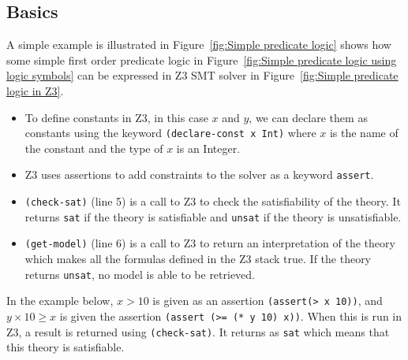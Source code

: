 \documentclass[a4paper]{report}
\begin{document}
\subsection{Basics}
A simple example is illustrated in Figure~\ref{fig:Simple predicate logic} shows how some simple first order predicate logic in Figure~\ref{fig:Simple predicate logic using logic symbols} can be expressed in Z3 SMT solver in  Figure~\ref{fig:Simple predicate logic in Z3}.
\begin{itemize}
\item To define constants in Z3, in this case $x$ and $y$, we can declare them as constants using the keyword \texttt{(declare-const x Int)} where $x$ is the name of the constant and the type of $x$ is an Integer.
\item Z3 uses assertions to add constraints to the solver as a keyword \texttt{assert}. 
\item \texttt{(check-sat)} (line 5) is a call to Z3 to check the satisfiability of the theory. It returns \texttt{sat} if the theory is satisfiable and \texttt{unsat} if the theory is unsatisfiable.
\item \texttt{(get-model)} (line 6) is a call to Z3 to return an interpretation of the theory which makes all the formulas defined in the Z3 stack true. If the theory returns \texttt{unsat}, no model is able to be retrieved.  
\end{itemize}

In the example below, $x > 10$ is given as an assertion \texttt{(assert(> x 10))}, and $y \times 10 \geq x$ is given the assertion \texttt{(assert (>= (* y 10) x))}. When this is run in Z3, a result is returned using  \texttt{(check-sat)}. It returns as \texttt{sat} which means that this theory is satisfiable.\\ 
\end{document}
